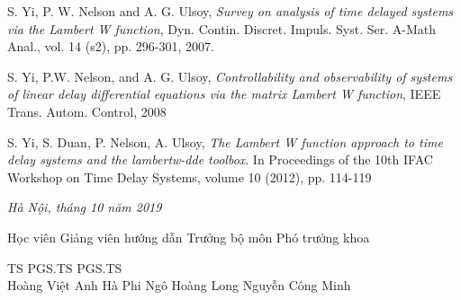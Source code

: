 \documentclass[12pt,oneside,portrait,a4paper]{book}
\theoremstyle{definition}
\theoremstyle{plain}
\begin{document}
\begin{thebibliography}{99}
S. Yi, P. W. Nelson and A. G. Ulsoy, \emph{Survey on analysis of time delayed systems via the Lambert W function}, Dyn. Contin. Discret. Impuls. Syst. Ser. A-Math Anal., vol. 14 (s2), pp. 296-301, 2007.

S. Yi, P.W. Nelson, and A. G. Ulsoy, \emph{Controllability and observability of systems of linear delay differential equations via the matrix Lambert W function}, IEEE Trans. Autom. Control, 2008

S. Yi, S. Duan, P. Nelson, A. Ulsoy, \emph{The Lambert W function approach to time delay systems and the lambertw-dde toolbox}. In Proceedings of the 10th IFAC Workshop on Time Delay Systems, volume 10 (2012), pp. 114-119

\end{thebibliography}
\vspace{10pt}

\phantom{***}

\begin{flushright}
\textit{Hà Nội, tháng 10 năm 2019}
\end{flushright}
\par
\par
{\small
	\hspace {-0,1cm} Học viên \hspace {0.5cm} Giảng viên hướng dẫn \hspace {0.7cm} Trưởng bộ môn \hspace {1.2cm} Phó trưởng khoa \\
	\par
	\vspace{1cm}
	\noindent  \hspace{3.8cm} TS \hspace{3cm} PGS.TS \hspace{2.7cm} PGS.TS\\
	\noindent Hoàng Việt Anh  \hspace*{0.9cm} Hà Phi \hspace{2,4cm}Ngô Hoàng Long \hspace{1,1cm} Nguyễn Công Minh
	
}
\end{document}
